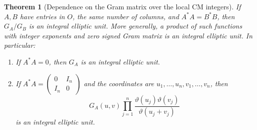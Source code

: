 \documentclass[a4paper,11pt]{article}
\newtheorem{theorem}[proposition]{Theorem}
\theoremstyle{definition}
\theoremstyle{remark}
\numberwithin{equation}{section}
\begin{document}
\begin{theorem}[Dependence on the Gram matrix over the local CM integers]\label{thm:gram66}
If \(A,B\) have entries in \(O\), the same number of columns,
and \(A^*A=B^*B\), then \(G_A/G_B\) is an integral elliptic
unit. More generally, a product of such functions with integer
exponents and zero signed Gram matrix is an integral elliptic unit.
In particular:
\begin{enumerate}
\item If \(A^*A=0\), then \(G_A\) is an integral elliptic unit.
\item If \(A^*A=\left(\begin{smallmatrix}0&I_n\\I_n&0\end{smallmatrix}\right)\)
and the coordinates are \(u_1,\ldots,u_n,v_1,\ldots,v_n\), then
\[
       G_A(u,v)\prod_{j=1}^n
           \frac{\vartheta(u_j)\vartheta(v_j)}{\vartheta(u_j+v_j)}
\]
is an integral elliptic unit.
\end{enumerate}
\end{theorem}
\end{document}
